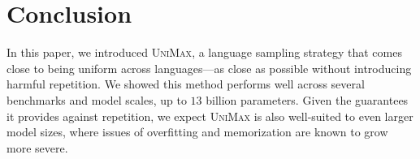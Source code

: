 \documentclass{article} %
\newcommand{\unimax}{\textsc{UniMax}}
\begin{document}
\begin{table}[]
\caption{Comparison to mT5\@. XNLI and PAWS-X show average per-language accuracy; the rest show average per-language EM/F1. We use the translate-train setting except for TyDi QA, which uses ``in-language''. We omit results for the \texttt{Large} configuration due to instabilities in training.}
\centering
{}
\label{table:final_model}
\end{table}

\section{Conclusion}

In this paper, we introduced \unimax{}, a language sampling strategy that comes close to being uniform across languages---as close as possible without introducing harmful repetition.  We showed this method performs well across several benchmarks and model scales, up to $13$ billion parameters.  Given the guarantees it provides against repetition, we expect \unimax{} is also well-suited to even larger model sizes, where issues of overfitting and memorization are known to grow more severe.
\end{document}
